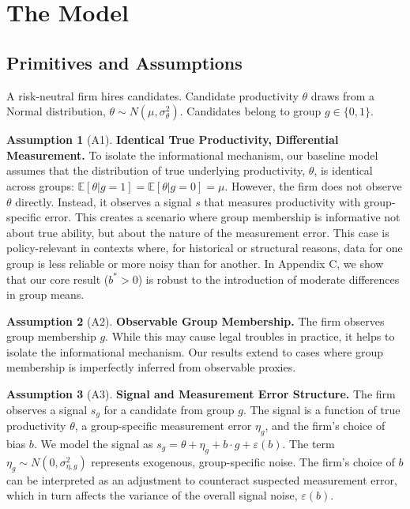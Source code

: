 \documentclass[12pt,a4paper]{article}
\theoremstyle{definition}
\newtheorem*{assumption}{Assumption}
\theoremstyle{remark}
\begin{document}
\section{The Model}

\subsection{Primitives and Assumptions}
A risk-neutral firm hires candidates. Candidate productivity $\theta$ draws from a Normal distribution, $\theta \sim N(\mu, \sigma_\theta^2)$. Candidates belong to group $g \in \{0, 1\}$.

\begin{assumption}[A1]
\textbf{Identical True Productivity, Differential Measurement.} To isolate the informational mechanism, our baseline model assumes that the distribution of true underlying productivity, $\theta$, is identical across groups: $\mathbb{E}[\theta|g=1] = \mathbb{E}[\theta|g=0] = \mu$. However, the firm does not observe $\theta$ directly. Instead, it observes a signal $s$ that measures productivity with group-specific error. This creates a scenario where group membership is informative not about true ability, but about the nature of the measurement error. This case is policy-relevant in contexts where, for historical or structural reasons, data for one group is less reliable or more noisy than for another. In Appendix C, we show that our core result ($b^*>0$) is robust to the introduction of moderate differences in group means.
\end{assumption}

\begin{assumption}[A2]
\textbf{Observable Group Membership.} The firm observes group membership $g$. While this may cause legal troubles in practice, it helps to isolate the informational mechanism. Our results extend to cases where group membership is imperfectly inferred from observable proxies.
\end{assumption}

\begin{assumption}[A3]
\textbf{Signal and Measurement Error Structure.} The firm observes a signal $s_g$ for a candidate from group $g$. The signal is a function of true productivity $\theta$, a group-specific measurement error $\eta_g$, and the firm's choice of bias $b$. We model the signal as $s_g = \theta + \eta_g + b \cdot g + \varepsilon(b)$. The term $\eta_g \sim N(0, \sigma_{\eta,g}^2)$ represents exogenous, group-specific noise. The firm's choice of $b$ can be interpreted as an adjustment to counteract suspected measurement error, which in turn affects the variance of the overall signal noise, $\varepsilon(b)$.
\end{assumption}
\end{document}
